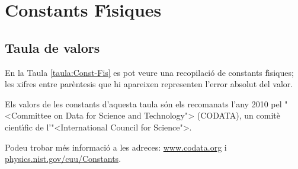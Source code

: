 \chapter{Constants F\'{\i}siques}\label{sec:const_fis} 

\section{Taula de valors}

En la Taula \vref{taula:Const-Fis} es pot veure una recopilaci\'{o} de
constants f\'{\i}siques; les xifres entre par\`{e}ntesis que hi apareixen representen l'error absolut del valor.

Els valors de les constants d'aquesta taula s\'{o}n els recomanats
l'any 2010 pel {"<}Committee on Data for Science and Technology{">}
(\textsf{CODATA}), un comit\`{e} cient\'{\i}fic de l'{"<}International Council
for Science{">}.

Podeu trobar  m\'{e}s informaci\'{o} a
les adreces: \href{http://www.codata.org/}{www.codata.org} i \href{http://physics.nist.gov/cuu/Constants/}{physics.nist.gov/cuu/Constants}.


